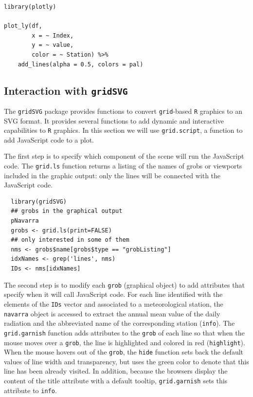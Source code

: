 \documentclass[smallroyalvopaper]{memoir}
\begin{document}
\lstset{language=r,label= ,caption= ,captionpos=b,numbers=none}
\begin{lstlisting}
library(plotly)

plot_ly(df,
        x = ~ Index,
        y = ~ value,
        color = ~ Station) %>%
    add_lines(alpha = 0.5, colors = pal)
\end{lstlisting}

\subsection{\floweroneleft Interaction with \texttt{gridSVG}}
\label{sec:org16008e2}
The \texttt{gridSVG} package provides functions to convert \texttt{grid}-based \texttt{R}
graphics to an SVG format. It provides several functions to add
dynamic and interactive capabilities to \texttt{R} graphics. In this section
we will use \texttt{grid.script}, a function to add JavaScript code to a
plot.

The first step is to specify which component of the scene
will run the JavaScript code. The \texttt{grid.ls} function  returns a
listing of the names of grobs or viewports included in the graphic
output: only the lines will be connected with the JavaScript
code. 


\lstset{language=r,label= ,caption= ,captionpos=b,numbers=none}
\begin{lstlisting}
  library(gridSVG)
  ## grobs in the graphical output
  pNavarra
  grobs <- grid.ls(print=FALSE)
  ## only interested in some of them
  nms <- grobs$name[grobs$type == "grobListing"]
  idxNames <- grep('lines', nms)
  IDs <- nms[idxNames]
\end{lstlisting}

The second step is to modify each \texttt{grob} (graphical object) to add
attributes that specify when it will call JavaScript code. For each
line identified with the elements of the \texttt{IDs} vector and associated
to a meteorological station, the \texttt{navarra} object is accessed to
extract the annual mean value of the daily radiation and the
abbreviated name of the corresponding station (\texttt{info}).  The
\texttt{grid.garnish} function adds attributes to the \texttt{grob} of each line so
that when the mouse moves over a \texttt{grob}, the line is highlighted and
colored in red (\texttt{highlight}). When the mouse hovers out of the \texttt{grob},
the \texttt{hide} function sets back the default values of line width and
transparency, but uses the green color to denote that this line has
been already visited. In addition, because the browsers display the
content of the title attribute with a default tooltip, \texttt{grid.garnish}
sets this attribute to \texttt{info}.
\end{document}
